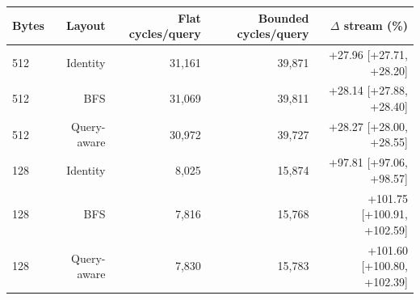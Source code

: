 \begin{tabular}{lrrrr}
\toprule
Bytes & Layout & Flat cycles/query & Bounded cycles/query & $\Delta$ stream (\%) \\
\midrule
512 & Identity & 31,161 & 39,871 & +27.96 [+27.71, +28.20] \\
512 & BFS & 31,069 & 39,811 & +28.14 [+27.88, +28.40] \\
512 & Query-aware & 30,972 & 39,727 & +28.27 [+28.00, +28.55] \\
128 & Identity & 8,025 & 15,874 & +97.81 [+97.06, +98.57] \\
128 & BFS & 7,816 & 15,768 & +101.75 [+100.91, +102.59] \\
128 & Query-aware & 7,830 & 15,783 & +101.60 [+100.80, +102.39] \\
\bottomrule
\end{tabular}

